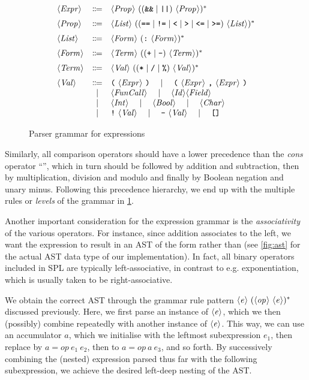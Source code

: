 \begin{figure}[h]
  \[
  \begin{array}{lcl}
		\NT{Expr} & \Coloneqq & \NT{Prop}\ ((\code{\&\&} \mid \code{||})\ \NT{Prop})^* \br
		\NT{Prop} & \Coloneqq & \NT{List}\ ((\code{==} \mid \code{!=} \mid \code{<} \mid \code{>} \mid \code{<=} \mid \code{>=})\ \NT{List})^* \br
		\NT{List} & \Coloneqq & \NT{Form}\ (\code{:}\ \NT{Form})^* \br
		\NT{Form} & \Coloneqq & \NT{Term}\ (( \code{+} \mid \code{-} )\ \NT{Term})^* \br
		\NT{Term} & \Coloneqq & \NT{Val}\ (( \code{*} \mid \code{/} \mid \code{\%} )\ \NT{Val} )^* \br
		\NT{Val} & \Coloneqq & \code{(}\ \NT{Expr}\ \code{)} \ruleSep
      \code{(}\ \NT{Expr}\ \code{,}\ \NT{Expr}\ \code{)} \\
		& \mid & \NT{FunCall} \ruleSep
      \NT{Id} \NT{Field} \\
    & \mid & \NT{Int} \ruleSep \NT{Bool} \ruleSep \NT{Char} \\
		& \mid & \code{!}\ \NT{Val} \ruleSep \code{-}\ \NT{Val} \ruleSep \code{[]}
  \end{array}
  \]
  \caption{Parser grammar for expressions}
  \label{fig:new-expr-grammar}
\end{figure}

Similarly, all comparison operators should have a lower precedence than the
\emph{cons} operator ``\code{:}'', which in turn should be followed by addition
and subtraction, then by multiplication, division and modulo and finally by
Boolean negation and unary minus.
Following this precedence hierarchy, we end up with the multiple rules or
\emph{levels} of the grammar in \cref{fig:new-expr-grammar}.

Another important consideration for the expression grammar is the
\emph{associativity} of the various operators. For instance, since addition
associates to the left, we want the expression  to result in an AST
of the form  rather than  (see
\cref{fig:ast} for the actual AST data type of our implementation).
In fact, all binary operators included in SPL are typically left-associative, in
contrast to e.g. exponentiation, which is usually taken to be right-associative.

We obtain the correct AST through the grammar rule pattern
$\langle \textit{e}\kern.7pt \rangle\ (\langle \textit{op}\kern.7pt \rangle\ \langle \textit{e}\kern.7pt \rangle)^*$ discussed previously.
Here, we first parse an instance of $\langle \textit{e}\kern.7pt \rangle$, which we then (possibly) combine
repeatedly with another instance of $\langle \textit{e}\kern.7pt \rangle$. This way, we can use an
accumulator $a$, which we initialise with the leftmost subexpression
$e_1$, then replace by $a = op\ e_1\ e_2$, then to $a = op\ a\ e_3$, and so
forth. By successively combining the (nested) expression parsed thus far with
the following subexpression, we achieve the desired left-deep nesting of the
AST.

